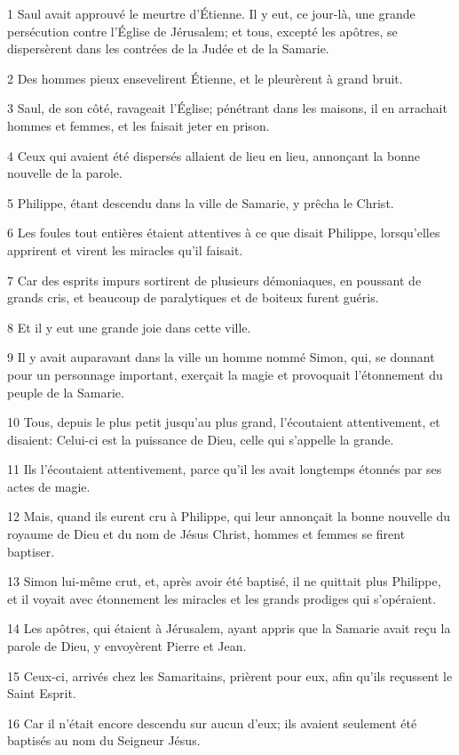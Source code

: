 \par 1 Saul avait approuvé le meurtre d'Étienne. Il y eut, ce jour-là, une grande persécution contre l'Église de Jérusalem; et tous, excepté les apôtres, se dispersèrent dans les contrées de la Judée et de la Samarie.
\par 2 Des hommes pieux ensevelirent Étienne, et le pleurèrent à grand bruit.
\par 3 Saul, de son côté, ravageait l'Église; pénétrant dans les maisons, il en arrachait hommes et femmes, et les faisait jeter en prison.
\par 4 Ceux qui avaient été dispersés allaient de lieu en lieu, annonçant la bonne nouvelle de la parole.
\par 5 Philippe, étant descendu dans la ville de Samarie, y prêcha le Christ.
\par 6 Les foules tout entières étaient attentives à ce que disait Philippe, lorsqu'elles apprirent et virent les miracles qu'il faisait.
\par 7 Car des esprits impurs sortirent de plusieurs démoniaques, en poussant de grands cris, et beaucoup de paralytiques et de boiteux furent guéris.
\par 8 Et il y eut une grande joie dans cette ville.
\par 9 Il y avait auparavant dans la ville un homme nommé Simon, qui, se donnant pour un personnage important, exerçait la magie et provoquait l'étonnement du peuple de la Samarie.
\par 10 Tous, depuis le plus petit jusqu'au plus grand, l'écoutaient attentivement, et disaient: Celui-ci est la puissance de Dieu, celle qui s'appelle la grande.
\par 11 Ils l'écoutaient attentivement, parce qu'il les avait longtemps étonnés par ses actes de magie.
\par 12 Mais, quand ils eurent cru à Philippe, qui leur annonçait la bonne nouvelle du royaume de Dieu et du nom de Jésus Christ, hommes et femmes se firent baptiser.
\par 13 Simon lui-même crut, et, après avoir été baptisé, il ne quittait plus Philippe, et il voyait avec étonnement les miracles et les grands prodiges qui s'opéraient.
\par 14 Les apôtres, qui étaient à Jérusalem, ayant appris que la Samarie avait reçu la parole de Dieu, y envoyèrent Pierre et Jean.
\par 15 Ceux-ci, arrivés chez les Samaritains, prièrent pour eux, afin qu'ils reçussent le Saint Esprit.
\par 16 Car il n'était encore descendu sur aucun d'eux; ils avaient seulement été baptisés au nom du Seigneur Jésus.
